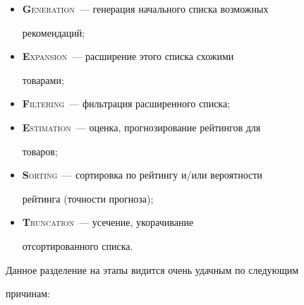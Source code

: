 \begin{itemize}


\item


\textsc{{\bf G}eneration}~--- генерация начального списка возможных


рекомендаций;


\item


\textsc{{\bf E}xpansion}~--- расширение этого списка схожими


товарами;


\item


\textsc{{\bf F}iltering}~--- фильтрация расширенного списка;


\item


\textsc{{\bf E}stimation}~--- оценка, прогнозирование рейтингов для


товаров;


\item


\textsc{{\bf S}orting}~--- сортировка по рейтингу и/или вероятности


рейтинга (точности прогноза);


\item


\textsc{{\bf T}runcation}~--- усечение, укорачивание


отсортированного списка.


\end{itemize}








\medskip





Данное разделение на этапы видится очень удачным по следующим


причинам:


